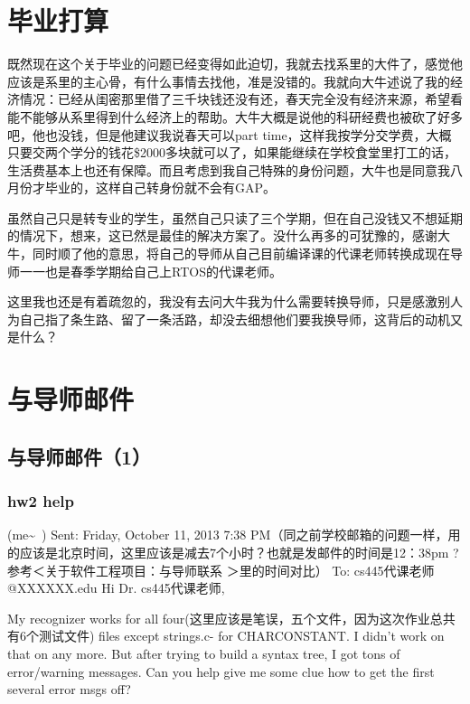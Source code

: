 \documentclass[12pt]{book}
\begin{document}
\chapter{毕业打算}
\label{sec-21}

既然现在这个关于毕业的问题已经变得如此迫切，我就去找系里的大件了，感觉他应该是系里的主心骨，有什么事情去找他，准是没错的。我就向大牛述说了我的经济情况：已经从闺密那里借了三千块钱还没有还，春天完全没有经济来源，希望看能不能够从系里得到什么经济上的帮助。大牛大概是说他的科研经费也被砍了好多吧，他也没钱，但是他建议我说春天可以part time，这样我按学分交学费，大概只要交两个学分的钱花\$2000多块就可以了，如果能继续在学校食堂里打工的话，生活费基本上也还有保障。而且考虑到我自己特殊的身份问题，大牛也是同意我八月份才毕业的，这样自己转身份就不会有GAP。

虽然自己只是转专业的学生，虽然自己只读了三个学期，但在自己没钱又不想延期的情况下，想来，这已然是最佳的解决方案了。没什么再多的可犹豫的，感谢大牛，同时顺了他的意思，将自己的导师从自己目前编译课的代课老师转换成现在导师一一也是春季学期给自己上RTOS的代课老师。　

这里我也还是有着疏忽的，我没有去问大牛我为什么需要转换导师，只是感激别人为自己指了条生路、留了一条活路，却没去细想他们要我换导师，这背后的动机又是什么？

\chapter{与导师邮件}
\label{sec-22}
\section{与导师邮件（1）}
\label{sec-22-1}

\subsection{hw2 help}
\label{sec-22-1-1}
(me\textasciitilde{}~)
Sent:        Friday, October 11, 2013 7:38 PM（同之前学校邮箱的问题一样，用的应该是北京时间，这里应该是减去7个小时？也就是发邮件的时间是12：38pm ? 参考＜关于软件工程项目：与导师联系 ＞里的时间对比）
To:        
cs445代课老师@XXXXXX.edu
Hi Dr. cs445代课老师, 

My recognizer works for all four(这里应该是笔误，五个文件，因为这次作业总共有6个测试文件) files except strings.c- for CHARCONSTANT. I didn't work on that on any more. 
But after trying to build a syntax tree, I got tons of error/warning messages. Can you help give me some clue how to get the first several error msgs off?
\end{document}
